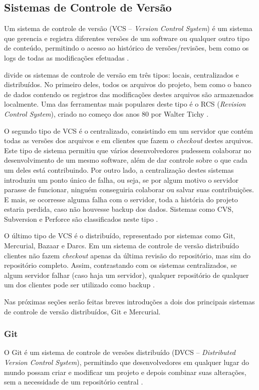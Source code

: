 \documentclass[diss]{template/setrem}
\begin{document}
\subsection{Sistemas de Controle de Versão}
Um sistema de controle de versão (VCS -- \emph{Version Control System}) é um sistema que gerencia e registra diferentes versões de um software ou qualquer outro tipo de conteúdo, permitindo o acesso ao histórico de versões/revisões, bem como os logs de todas as modificações efetuadas \citep{Loeliger2009}.

\citet{Chacon2009} divide os sistemas de controle de versão em três tipos: locais, centralizados e distribuídos. No primeiro deles, todos os arquivos do projeto, bem como o banco de dados contendo os registros das modificações destes arquivos são armazenados localmente. Uma das ferramentas mais populares deste tipo é o RCS (\emph{Revision Control System}), criado no começo dos anos 80 por Walter Tichy \citep{Loeliger2009}.

O segundo tipo de VCS é o centralizado, consistindo em um servidor que contém todas as versões dos arquivos e em clientes que fazem o \emph{checkout} destes arquivos. Este tipo de sistema permitiu que vários desenvolvedores pudessem colaborar no desenvolvimento de um mesmo software, além de dar controle sobre o que cada um deles está contribuindo. Por outro lado, a centralização destes sistemas introduziu um ponto único de falha, ou seja, se por algum motivo o servidor parasse de funcionar, ninguém conseguiria colaborar ou salvar suas contribuições. E mais, se ocorresse alguma falha com o servidor, toda a história do projeto estaria perdida, caso não houvesse backup dos dados. Sistemas como CVS, Subversion e Perforce são classificados neste tipo \citep{Chacon2009}.

O último tipo de VCS é o distribuído, representado por sistemas como Git, Mercurial, Bazaar e Darcs. Em um sistema de controle de versão distribuído clientes não fazem \emph{checkout} apenas da última revisão do repositório, mas sim do repositório completo. Assim, contrastando com os sistemas centralizados, se algum servidor falhar (caso haja um servidor), qualquer repositório de qualquer um dos clientes pode ser utilizado como backup \citep{Chacon2009}.

Nas próximas seções serão feitas breves introduções a dois dos principais sistemas de controle de versão distribuídos, Git e Mercurial.

\subsubsection{Git}
O Git é um sistema de controle de versões distribuído (DVCS -- \emph{Distributed Version Control System}), permitindo que desenvolvedores em qualquer lugar do mundo possam criar e modificar um projeto e depois combinar suas alterações, sem a necessidade de um repositório central \citep{Loeliger2009}.
\end{document}
